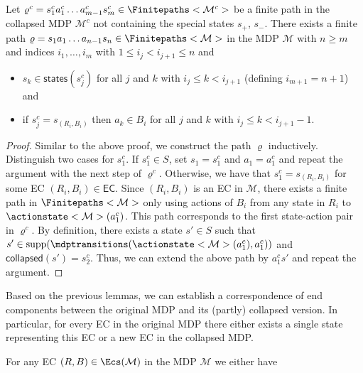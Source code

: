 \documentclass{article}
\newcommand{\intersectionSym}{\cap}
\newcommand{\intersectionBin}{\mathbin{\intersectionSym}}
\newcommand{\intersection}{\intersectionBin}
\newcommand{\MDP}{\mathcal{M}}
\newcommand{\States}{S}
\newcommand{\Actions}{Act}
\newcommand{\finitepath}{\varrho}
\DeclareMathOperator{\support}{supp}
\newcommand{\targetstate}{s_+}
\newcommand{\sinkstate}{s_-}
\newcommand{\eccollapsed}{\mathsf{collapsed}}
\newcommand{\ecstates}{\mathsf{states}}
\newcommand{\algoecs}{\mathsf{EC}}
\begin{document}
\begin{lemma} \label{stm:collapse:path_collapsed_to_normal}
	Let $\finitepath^c = s^c_1 a^c_1 \dots a^c_{m-1} s^c_m \in \Finitepaths<\MDP^c>$ be a finite path in the collapsed MDP $\MDP^c$ not containing the special states $\targetstate$, $\sinkstate$.
	There exists a finite path $\finitepath = s_1 a_1 \dots a_{n-1} s_n \in \Finitepaths<\MDP>$ in the MDP $\MDP$ with $n \geq m$ and indices $i_1, \dots, i_m$ with $1 \leq i_j < i_{j+1} \leq n$ and
	\begin{itemize}
		\item $s_k \in \ecstates(s^c_j)$ for all $j$ and $k$ with $i_j \leq k < i_{j+1}$ (defining $i_{m+1} = n + 1$) and
		\item if $s^c_j = s_{(R_i, B_i)}$ then $a_k \in B_i$ for all $j$ and $k$ with $i_j \leq k < i_{j+1} - 1$.
	\end{itemize}
\end{lemma}
\begin{proof}
	Similar to the above proof, we construct the path $\finitepath$ inductively.
	Distinguish two cases for $s^c_1$.
	If $s^c_1 \in \States$, set $s_1 = s^c_1$ and $a_1 = a^c_1$ and repeat the argument with the next step of $\finitepath^c$.
	Otherwise, we have that $s^c_1 = s_{(R_i, B_i)}$ for some EC $(R_i, B_i) \in \algoecs$.
	Since $(R_i, B_i)$ is an EC in $\MDP$, there exists a finite path in $\Finitepaths<\MDP>$ only using actions of $B_i$ from any state in $R_i$ to $\actionstate<\MDP>(a^c_1)$.
	This path corresponds to the first state-action pair in $\finitepath^c$.
	By definition, there exists a state $s' \in \States$ such that $s' \in \support(\mdptransitions(\actionstate<\MDP>(a^c_1), a^c_1))$ and $\eccollapsed(s') = s^c_2$.
	Thus, we can extend the above path by $a^c_1 s'$ and repeat the argument. 
\end{proof}
Based on the previous lemmas, we can establish a correspondence of end components between the original MDP and its (partly) collapsed version.
In particular, for every EC in the original MDP there either exists a single state representing this EC or a new EC in the collapsed MDP.
\begin{lemma} \label{stm:collapse:ec_correspondence_normal_to_collapse}
	For any EC $(R, B) \in \Ecs(\MDP)$ in the MDP $\MDP$ we either have
\end{lemma}
\end{document}
